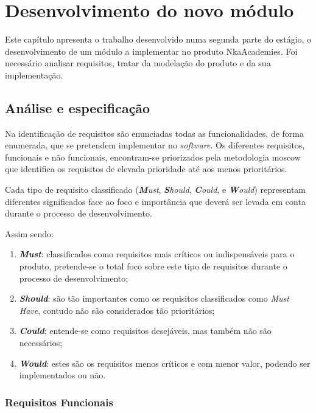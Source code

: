 
\chapter{Desenvolvimento do novo módulo}
\label{desenv}
Este capítulo apresenta o trabalho desenvolvido numa segunda parte do estágio, o desenvolvimento de um módulo a implementar no produto NkaAcademies. Foi necessário analisar requisitos, tratar da modelação do produto e da sua implementação.

\section{Análise e especificação}

Na identificação de requisitos são enunciadas todas as funcionalidades, de forma enumerada, que se pretendem implementar no \textit{software}.
Os diferentes requisitos, funcionais e não funcionais, encontram-se priorizados pela metodologia \acrshort{moscow} que identifica os requisitos de elevada prioridade até aos menos prioritários.

Cada tipo de requisito classificado (\textit{\textbf{M}ust}, \textit{\textbf{S}hould}, \textit{\textbf{C}ould}, e \textit{\textbf{W}ould}) representam diferentes significados face ao foco e importância que deverá ser levada em conta durante o processo de desenvolvimento.

Assim sendo:


\begin{enumerate}
  \item \textbf{\textit{Must}}: classificados como requisitos mais críticos ou indispensáveis para o produto, pretende-se o total foco sobre este tipo de requisitos durante o processo de desenvolvimento;
  \item \textbf{\textit{Should}}: são tão importantes como os requisitos classificados como \textit{Must Have}, contudo não são considerados tão prioritários;
  \item \textbf{\textit{Could}}: entende-se como requisitos desejáveis, mas também não são necessários;
  \item \textbf{\textit{Would}}: estes são os requisitos menos críticos e com menor valor, podendo ser implementados ou não.
\end{enumerate}

\subsection{Requisitos Funcionais}


